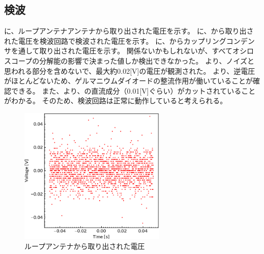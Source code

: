 \documentclass[report.tex]{subfiles}
\begin{document}
\subsection{検波}

に、ループアンテナアンテナから取り出された電圧を示す。
に、から取り出された電圧を検波回路で検波された電圧を示す。
に、からカップリングコンデンサを通して取り出された電圧を示す。
関係ないかもしれないが、すべてオシロスコープの分解能の影響で決まった値しか検出できなかった。
より、ノイズと思われる部分を含めないで、最大約0.02[V]の電圧が観測された。
より、逆電圧がほとんどないため、ゲルマニウムダイオードの整流作用が働いていることが確認できる。
また、より、の直流成分（0.01[V]ぐらい）がカットされていることがわかる。
そのため、検波回路は正常に動作していると考えられる。

\begin{figure}[H]
	\centering
	\includegraphics[width=7cm]{fig/koil.pdf}
	\caption{ループアンテナから取り出された電圧}
	\label{fig:koil}
\end{figure}
\end{document}
